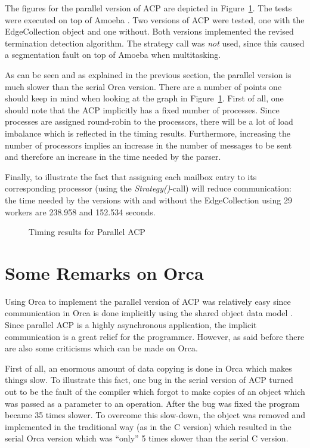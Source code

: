 The figures for the parallel version of ACP are depicted in
Figure~\ref{results}. The tests were executed on top of Amoeba
\cite{amoeba1}. Two versions of ACP were tested, 
one with the EdgeCollection object and one without. Both versions
implemented the revised termination detection algorithm. The strategy call
was {\em not} used, since this caused a segmentation fault on top of
Amoeba when multitasking.

As can be seen and as explained in the previous section, the parallel
version is much slower than the serial Orca
version. There are a number of points one should keep in mind when
looking at the graph in Figure~\ref{results}. First of all, one should note that the
ACP implicitly has a fixed number of processes. Since processes are
assigned round-robin to the processors, there will be a lot of load
imbalance which is reflected in the timing results. Furthermore,
increasing the number of processors implies an increase in the number
of messages to be sent and therefore an increase in the time needed
by the parser.

Finally, to illustrate the fact that assigning each mailbox entry to
its corresponding processor (using the {\em Strategy()}-call) will
reduce communication: the time needed by the versions with and
without the EdgeCollection using 29 workers are 238.958 and 152.534 seconds. 

\begin{figure}
\begin{center}

\end{center}
\caption{Timing results for Parallel ACP}
\label{results}
\end{figure}

\section {Some Remarks on Orca}

Using Orca to implement the parallel version of ACP was relatively
easy since communication in Orca is done implicitly using the shared
object data model \cite {orca}. Since parallel ACP is a highly
asynchronous application, the implicit communication is a great relief
for the programmer. However, as said before there are also some
criticisms which can be made on Orca.

First of all, an enormous amount of data copying is done in Orca
which makes things slow. To illustrate this fact, one bug
in the serial version of ACP turned out to be the fault of the
compiler which forgot to make copies of an object which was passed as a
parameter to an operation. After the bug was fixed the program became
35 times slower. To overcome this slow-down, the object was removed
and implemented in the traditional way (as in the C version) which
resulted in the serial Orca version which was ``only'' 5 times slower than the
serial C version. 

